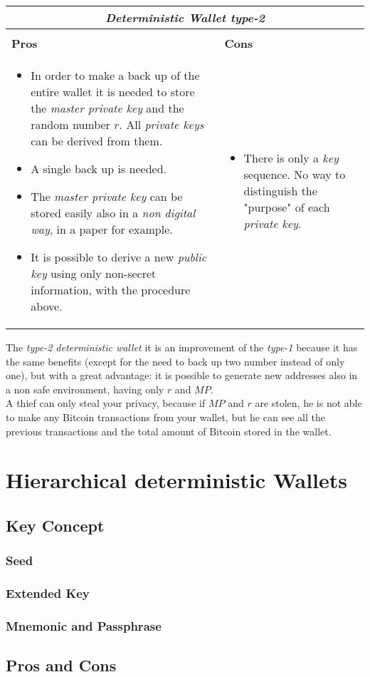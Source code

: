 \begin{center}
	\begin{tabular}{ |p{6cm}|p{6cm}|  }
		\hline
		\multicolumn{2}{|c|}{\textbf{\textit{Deterministic Wallet type-2}}} \\
		\hline \hline 
		\\
		\centerline{\textbf{Pros}}&\centerline{\textbf{Cons}}\\
		\hline
		\begin{itemize}
			\item In order to make a back up of the entire wallet it is needed to store the \textit{master private key} and the random number $r$. All \textit{private keys} can be derived from them.
			\item A single back up is needed.
			\item The \textit{master private key} can be stored easily also in a \textit{non digital way}, in a paper for example.
			\item It is possible to derive a new \textit{public key} using only non-secret information, with the procedure above.
		\end{itemize} &
		\begin{itemize}
			\item There is only a \textit{key} sequence. No way to distinguish the "purpose" of each \textit{private key}.
		\end{itemize}\\
		\hline
	\end{tabular}
\end{center}
The \textit{type-2 deterministic wallet} it is an improvement of the \textit{type-1} because it has the same benefits (except for the need to back up two number instead of only one), but with a great advantage: it is possible to generate new addresses also in a non safe environment, having only $r$ and $MP$. \\
A thief can only steal your privacy, because if $MP$ and $r$ are stolen, he is not able to make any Bitcoin transactions from your wallet, but he can see all the previous transactions and the total amount of Bitcoin stored in the wallet.

\section{Hierarchical deterministic Wallets}

\subsection{Key Concept}

\subsubsection{Seed}

\subsubsection{Extended Key}

\subsubsection{Mnemonic and Passphrase}

\subsection{Pros and Cons}

